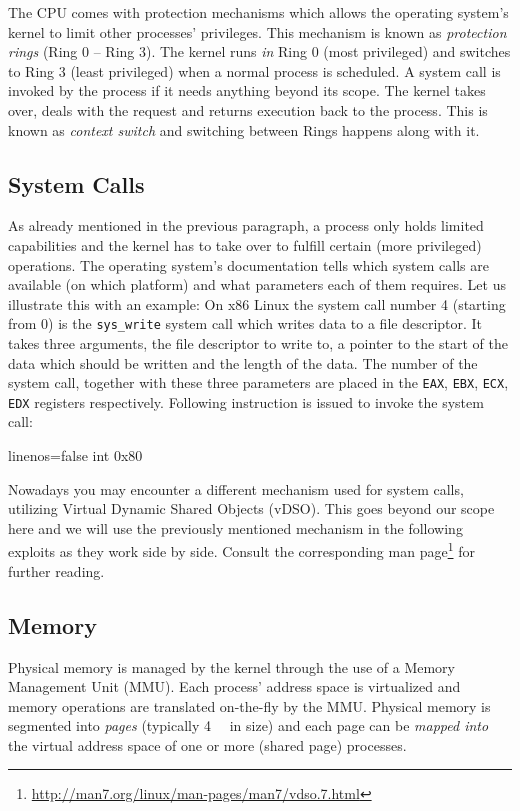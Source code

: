 \documentclass[article]{uibk}
\begin{document}
The CPU comes with protection mechanisms which allows the operating system's
kernel to limit other processes' privileges. This mechanism is known as
\textit{protection rings} (Ring 0 -- Ring 3). The kernel runs \emph{in} Ring 0
(most privileged) and switches to Ring 3 (least privileged) when a normal
process is scheduled. A system call is invoked by the process if it needs
anything beyond its scope. The kernel takes over, deals with the request and
returns execution back to the process. This is known as \textit{context switch}
and switching between Rings happens along with it.

\subsection{System Calls}

As already mentioned in the previous paragraph, a process only holds limited
capabilities and the kernel has to take over to fulfill certain (more
privileged) operations. The operating system's documentation tells which system
calls are available (on which platform) and what parameters each of them
requires. Let us illustrate this with an example: On x86 Linux the system call
number 4 (starting from 0) is the \texttt{sys\_write} system call which writes
data to a file descriptor. It takes three arguments, the file descriptor to
write to, a pointer to the start of the data which should be written and the
length of the data. The number of the system call, together with these three
parameters are placed in the \texttt{EAX}, \texttt{EBX}, \texttt{ECX},
\texttt{EDX} registers respectively. Following instruction is issued to invoke
the system call:

\begin{nasmcode*}{linenos=false}
    int     0x80
\end{nasmcode*}

Nowadays you may encounter a different mechanism used for system calls,
utilizing Virtual Dynamic Shared Objects (vDSO). This goes beyond our scope
here and we will use the previously mentioned mechanism in the following
exploits as they work side by side. Consult the corresponding man
page\footnote{\url{http://man7.org/linux/man-pages/man7/vdso.7.html}} for
further reading.

\subsection{Memory}

Physical memory is managed by the kernel through the use of a Memory Management
Unit (MMU). Each process' address space is virtualized and memory operations
are translated on-the-fly by the MMU. Physical memory is segmented into
\textit{pages} (typically \SI{4}{\kibi\byte} in size) and each page can be
\emph{mapped into} the virtual address space of one or more (shared page)
processes.~\cite[pp.~400]{unix_interals}
\end{document}
